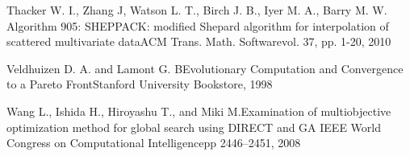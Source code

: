 {Thacker W. I., Zhang J, Watson L. T., Birch J. B., Iyer M. A., Barry M. W.}
{Algorithm 905: SHEPPACK: modified Shepard algorithm for interpolation of 
scattered multivariate data}{ACM Trans. Math. Software}{vol. 37, pp. 1-20, 
2010}

{Veldhuizen D. A. and Lamont G. B}{Evolutionary Computation and 
Convergence to a Pareto Front}{Stanford University Bookstore, 1998}

{Wang L., Ishida H., Hiroyashu T., and Miki M.}{Examination of 
multiobjective optimization method for global search using DIRECT and GA}
{IEEE World Congress on Computational Intelligence}{pp 2446--2451, 2008}

\bye
